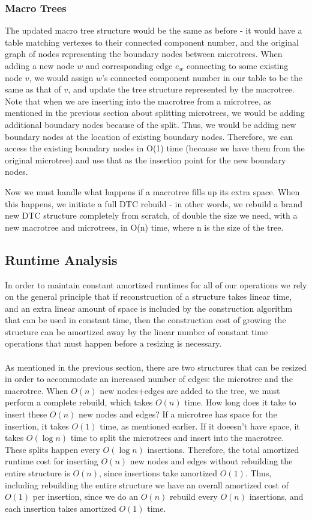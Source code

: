 \documentclass{article}
\begin{document}
\subsubsection{Macro Trees}
The updated macro tree structure would be the same as before - it would have a table matching vertexes to their connected component number, and the original graph of nodes representing the boundary nodes between microtrees.  When adding a new node $w$ and corresponding edge $e_w$ connecting to some existing node $v$, we would assign $w$'s connected component number in our table to be the same as that of $v$, and update the tree structure represented by the macrotree.  Note that when we are inserting into the macrotree from a microtree, as mentioned in the previous section about splitting microtrees, we would be adding additional boundary nodes because of the split.  Thus, we would be adding new boundary nodes at the location of existing boundary nodes.  Therefore, we can access the existing boundary nodes in O(1) time (because we have them from the original microtree) and use that as the insertion point for the new boundary nodes.

Now we must handle what happens if a macrotree fills up its extra space.  When this happens, we initiate a full DTC rebuild - in other words, we rebuild a brand new DTC structure completely from scratch, of double the size we need, with a new macrotree and microtrees, in O(n) time, where n is the size of the tree.

\subsection{Runtime Analysis}
In order to maintain constant amortized runtimes for all of our operations we rely on the general principle that if reconstruction of a structure takes linear time, and an extra linear amount of space is included by the construction algorithm that can be used in constant time, then the construction cost of growing the structure can be amortized away by the linear number of constant time operations that must happen before a resizing is necessary. \\ \\
As mentioned in the previous section, there are two structures that can be resized in order to accommodate an increased number of edges: the microtree and the macrotree. When $O(n)$ new nodes+edges are added to the tree, we must perform a complete rebuild, which takes $O(n)$ time.  How long does it take to insert these $O(n)$ new nodes and edges?  If a microtree has space for the insertion, it takes $O(1)$ time, as mentioned earlier.  If it doeesn't have space, it takes $O(\log n)$ time to split the microtrees and insert into the macrotree.  These splits happen every $O(\log n)$ insertions.  Therefore, the total amortized runtime cost for inserting $O(n)$ new nodes and edges without rebuilding the entire structure is $O(n)$, since insertions take amortized $O(1)$.  Thus, including rebuilding the entire structure we have an overall amortized cost of $O(1)$ per insertion, since we do an $O(n)$ rebuild every $O(n)$ insertions, and each insertion takes amortized $O(1)$ time.
\end{document}
